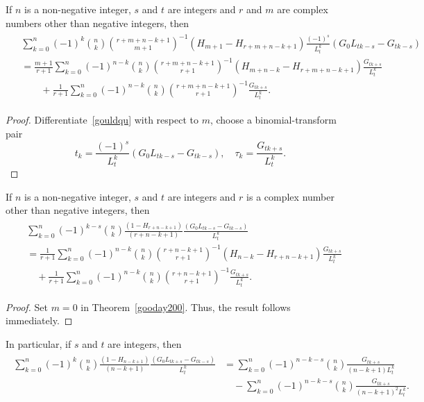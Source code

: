 \documentclass[12pt,reqno]{article}
\begin{document}
\begin{theorem}\label{gooday200}
	If $n$ is a non-negative integer, $s$ and $t$ are integers and $r$ and $m$ are complex numbers other than negative integers, then 
	\begin{align}\label{gooday100}
		\begin{split}
			&\sum_{k=0}^n(-1)^k\binom{n}{k}\binom{r+m+n-k+1}{m+1}^{-1}\left(H_{m+1}-H_{r+m+n-k+1}\right)\frac{(-1)^s}{L^k_t}\left(G_0L_{tk-s}-G_{tk-s}\right)\\
			&=\frac{m+1}{r+1}\sum_{k=0}^n(-1)^{n-k}\binom{n}{k}\binom{r+m+n-k+1}{r+1}^{-1}\left(H_{m+n-k}-H_{r+m+n-k+1}\right)\frac{G_{tk+s}}{L_{t}^k}\\
			&\qquad +\frac1{r+1}\sum_{k=0}^n(-1)^{n-k}\binom{n}{k}\binom{r+m+n-k+1}{r+1}^{-1}\frac{G_{tk+s}}{L_{t}^k}.
		\end{split}
	\end{align}
\end{theorem}
\begin{proof}

		Differentiate~\eqref{gouldqu} with respect to $m$, choose a binomial-transform pair
		$$t_k=\frac{(-1)^s}{L^k_t}\left(G_0L_{tk-s}-G_{tk-s}\right), \quad \tau_k=\frac{G_{tk+s}}{L^k_t}.$$
\end{proof}
\begin{corollary}
If $n$ is a non-negative integer, $s$ and $t$ are integers and $r$ is a complex number other than negative integers, then 
\begin{align}\label{go130}
	\begin{split}
		&\sum_{k=0}^n(-1)^{k-s}\binom{n}{k}\frac{\left(1-H_{r+n-k+1}\right)}{(r+n-k+1)}\frac{\left(G_0L_{tk-s}-G_{tk-s}\right)}{L_t^k}\\
		&=\frac{1}{r+1}\sum_{k=0}^n(-1)^{n-k}\binom{n}{k}\binom{r+n-k+1}{r+1}^{-1}\left(H_{n-k}-H_{r+n-k+1}\right)\frac{G_{tk+s}}{L_t^k}\\
		&\quad +\frac{1}{r+1}\sum_{k=0}^n(-1)^{n-k}\binom{n}{k}\binom{r+n-k+1}{r+1}^{-1}\frac{G_{tk+s}}{L_t^k}.	
	\end{split}	
\end{align}
\end{corollary}
\begin{proof}
Set $m=0$ in Theorem~\ref{gooday200}. Thus, the result follows immediately.
\end{proof}
In particular, if $s$ and $t$ are integers, then
\begin{align}
	\label{may117}
	\begin{split}
		\sum_{k=0}^n (-1)^k\binom{n}{k}\frac{(1-H_{n-k+1})}{(n-k+1)}\frac{\left(G_0L_{tk+s}-G_{tk-s}\right)}{L_t^k}
		&=\sum_{k = 0}^n(-1)^{n-k-s}\binom{n}{k}\frac{G_{tk+s}}{(n-k+1)L_t^k}\\
		&\quad -\sum_{k = 0}^n(-1)^{n-k-s}\binom{n}{k}\frac{G_{tk+s}}{(n-k+1)^2L_t^k}.
	\end{split}
\end{align}
\end{document}
